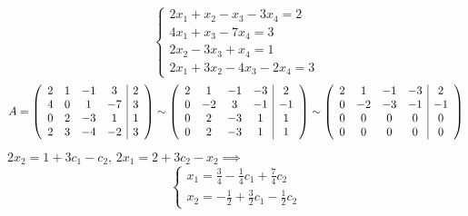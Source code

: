 \documentclass[12pt, a4paper]{article}
\begin{document}
    \begin{exmp}
        \[
            \begin{cases}
                2x_{1} + x_{2} - x_{3} - 3x_{4} = 2 \\
                4x_{1} + x_{3} - 7x_{4} = 3 \\
                2x_{2} - 3x_{3} + x_{4} = 1 \\
                2x_{1} + 3x_{2} - 4x_{3} - 2x_{4} = 3
            \end{cases}
        \] 
        \[
            A = \left(\begin{array}{c c c c | c} 2 & 1 & -1 & 3 & 2 \\ 4 & 0 & 1 & -7 & 3 \\ 0 & 2 & -3 & 1 & 1 \\ 2 & 3 & -4 & -2 & 3  \end{array} \right) \sim \left( \begin{array}{c c c c | c}
                2 & 1 & -1 & -3 & 2 \\ 0 & -2 & 3 & -1 & -1 \\ 0 & 2 & -3 & 1 & 1 \\ 0 & 2 & -3 & 1 & 1
                \end{array} \right) \sim \left( \begin{array}{c c c c | c} 2 & 1 & -1 & -3 & 2 \\ 0 & -2 & -3 & -1 & -1 \\ 0 & 0 & 0 & 0 & 0 \\ 0 & 0 & 0 & 0 & 0
            \end{array} \right)  
        \] \( 2x_{2} = 1 + 3c_{1} - c_{2}, \, 2x_{1} = 2 + 3c_{2} - x_{2} \implies\) \[
            \begin{cases}
                x_{1} = \frac{3}{4} - \frac{1}{4}c_{1} + \frac{7}{4}c_{2} \\
                x_{2} = -\frac{1}{2} + \frac{3}{2}c_{1} - \frac{1}{2}c_{2}
            \end{cases}
        \]  
        
    \end{exmp}
      
    
\end{document}
